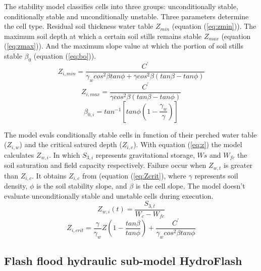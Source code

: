 {The stability model classifies cells into three groups: unconditionally stable, conditionally stable and unconditionally unstable.  Three parameters determine the cell type.  Residual soil thickness water table $Z_{min}$ (equation (\ref{eq:zmin})).  The maximum soil depth at which a certain soil stills remains stable $Z_{max}$ (equation (\ref{eq:zmax})).  And the maximum slope value at which the portion of soil stills stable $\beta_0$ (equation (\ref{eq:bo})). \\

\begin{equation}
 Z_{i,min} = \frac{C^{'}}{\gamma_w cos^2 \beta tan \phi + \gamma cos^2 \beta (tan\beta - tan \phi)}
    \label{eq:zmin}
\end{equation}
\begin{equation}
 Z_{i,max} = \frac{C^{'}}{\gamma cos^2 \beta (tan\beta - tan \phi)}
 \label{eq:zmax}
\end{equation}
\begin{equation}
 \beta_{0,i} = tan ^{-1} \left[ tan \phi \left( 1- \frac{\gamma_w}{\gamma}\right) \right]
 \label{eq:bo}
\end{equation}

The model evals conditionally stable cells in function of their perched water table ($Z_{i,w}$) and the critical satured depth ($Z_{i,c}$).  With equation (\ref{eq:z}) the model calculates $Z_{w,i}$. In which $S_{3,i}$ represents gravitational storage, $Ws$ and $W_{fc}$ the soil saturation and field capacity respectively. Failure occur when $Z_{w,t}$ is greater than $Z_{i,c}$.  It obtains $Z_{i,c}$ from (equation (\ref{eq:Zcrit}), where $\gamma$ represents soil density, $\phi$ is the soil stability slope, and $\beta$ is the cell slope.  The model doesn't evaluate unconditionally stable and unstable cells during execution.\\

\begin{equation}
 Z_{w,i}(t) = \frac{S_{3,t}}{W_c - W_{fc}}
 \label{eq:z}
\end{equation}
\begin{equation}
 Z_{i,crit} = \frac{\gamma}{\gamma_w} Z \left( 1-\frac{tan \beta}{tan\phi} \right)
     + \frac{C^{'}}{\gamma_w cos^2 \beta tan\phi}
 \label{eq:Zcrit}
\end{equation}

\subsection{Flash flood hydraulic sub-model HydroFlash}

}
